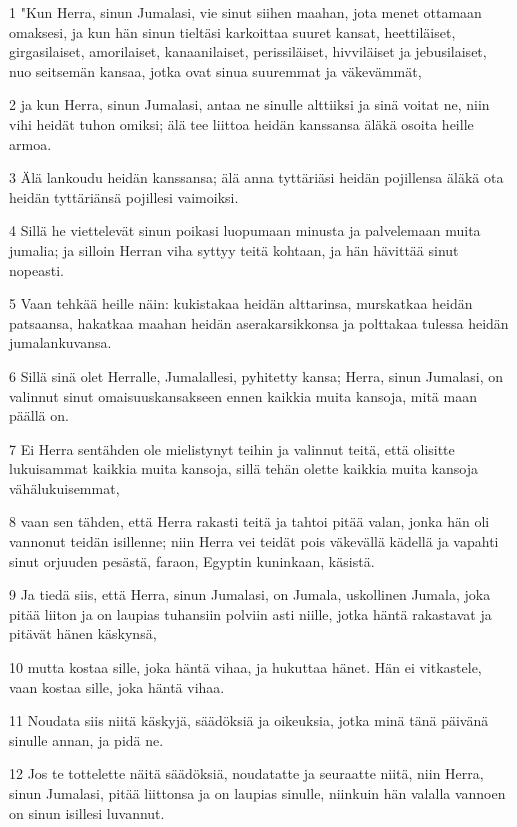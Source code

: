 \par 1 "Kun Herra, sinun Jumalasi, vie sinut siihen maahan, jota menet ottamaan omaksesi, ja kun hän sinun tieltäsi karkoittaa suuret kansat, heettiläiset, girgasilaiset, amorilaiset, kanaanilaiset, perissiläiset, hivviläiset ja jebusilaiset, nuo seitsemän kansaa, jotka ovat sinua suuremmat ja väkevämmät,
\par 2 ja kun Herra, sinun Jumalasi, antaa ne sinulle alttiiksi ja sinä voitat ne, niin vihi heidät tuhon omiksi; älä tee liittoa heidän kanssansa äläkä osoita heille armoa.
\par 3 Älä lankoudu heidän kanssansa; älä anna tyttäriäsi heidän pojillensa äläkä ota heidän tyttäriänsä pojillesi vaimoiksi.
\par 4 Sillä he viettelevät sinun poikasi luopumaan minusta ja palvelemaan muita jumalia; ja silloin Herran viha syttyy teitä kohtaan, ja hän hävittää sinut nopeasti.
\par 5 Vaan tehkää heille näin: kukistakaa heidän alttarinsa, murskatkaa heidän patsaansa, hakatkaa maahan heidän aserakarsikkonsa ja polttakaa tulessa heidän jumalankuvansa.
\par 6 Sillä sinä olet Herralle, Jumalallesi, pyhitetty kansa; Herra, sinun Jumalasi, on valinnut sinut omaisuuskansakseen ennen kaikkia muita kansoja, mitä maan päällä on.
\par 7 Ei Herra sentähden ole mielistynyt teihin ja valinnut teitä, että olisitte lukuisammat kaikkia muita kansoja, sillä tehän olette kaikkia muita kansoja vähälukuisemmat,
\par 8 vaan sen tähden, että Herra rakasti teitä ja tahtoi pitää valan, jonka hän oli vannonut teidän isillenne; niin Herra vei teidät pois väkevällä kädellä ja vapahti sinut orjuuden pesästä, faraon, Egyptin kuninkaan, käsistä.
\par 9 Ja tiedä siis, että Herra, sinun Jumalasi, on Jumala, uskollinen Jumala, joka pitää liiton ja on laupias tuhansiin polviin asti niille, jotka häntä rakastavat ja pitävät hänen käskynsä,
\par 10 mutta kostaa sille, joka häntä vihaa, ja hukuttaa hänet. Hän ei vitkastele, vaan kostaa sille, joka häntä vihaa.
\par 11 Noudata siis niitä käskyjä, säädöksiä ja oikeuksia, jotka minä tänä päivänä sinulle annan, ja pidä ne.
\par 12 Jos te tottelette näitä säädöksiä, noudatatte ja seuraatte niitä, niin Herra, sinun Jumalasi, pitää liittonsa ja on laupias sinulle, niinkuin hän valalla vannoen on sinun isillesi luvannut.
